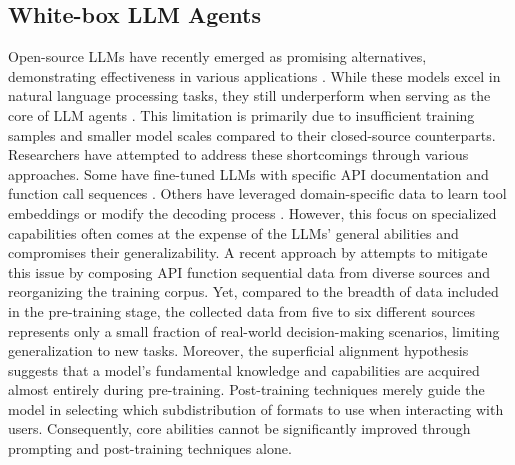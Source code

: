 \subsection{White-box LLM Agents}
Open-source LLMs have recently emerged as promising alternatives, demonstrating effectiveness in various applications \citep{touvron2023llama, jiang2024mixtral,tang-etal-2024-mimir}. While these models excel in natural language processing tasks, they still underperform when serving as the core of LLM agents \citep{zeng2023agenttuning, liu2024agentbench}. This limitation is primarily due to insufficient training samples and smaller model scales compared to their closed-source counterparts.
Researchers have attempted to address these shortcomings through various approaches. Some have fine-tuned LLMs with specific API documentation and function call sequences \citep{qin2023toolllm, gou2024tora}. Others have leveraged domain-specific data to learn tool embeddings or modify the decoding process \citep{schick2024toolformer, hao2024toolkengpt, zhang2023syntax}. However, this focus on specialized capabilities often comes at the expense of the LLMs' general abilities and compromises their generalizability.
A recent approach by \citet{chen2024agent} attempts to mitigate this issue by composing API function sequential data from diverse sources and reorganizing the training corpus. Yet, compared to the breadth of data included in the pre-training stage, the collected data from five to six different sources represents only a small fraction of real-world decision-making scenarios, limiting generalization to new tasks.
Moreover, the superficial alignment hypothesis \citep{zhou2024lima} suggests that a model's fundamental knowledge and capabilities are acquired almost entirely during pre-training. Post-training techniques merely guide the model in selecting which subdistribution of formats to use when interacting with users. Consequently, core abilities cannot be significantly improved through prompting and post-training techniques alone.



